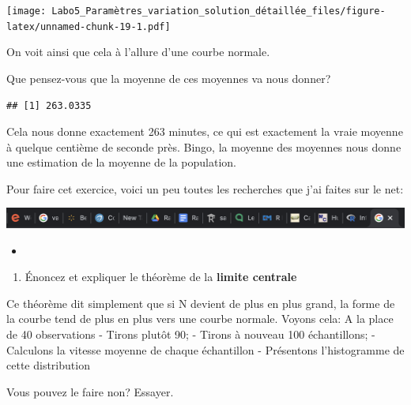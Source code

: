 \documentclass[
]{article}
\newenvironment{Shaded}{\begin{snugshade}}{\end{snugshade}}
\newcommand{\FunctionTok}[1]{\textcolor[rgb]{0.00,0.00,0.00}{#1}}
\newcommand{\NormalTok}[1]{#1}
\newcommand{\OtherTok}[1]{\textcolor[rgb]{0.56,0.35,0.01}{#1}}
\newcommand{\SpecialCharTok}[1]{\textcolor[rgb]{0.00,0.00,0.00}{#1}}
\providecommand{\tightlist}{%
  \setlength{\itemsep}{0pt}\setlength{\parskip}{0pt}}
\begin{document}
\texttt{[image: Labo5\_Paramètres\_variation\_solution\_détaillée\_files/figure-latex/unnamed-chunk-19-1.pdf]}

On voit ainsi que cela à l'allure d'une courbe normale.

Que pensez-vous que la moyenne de ces moyennes va nous donner?

\begin{Shaded}
\end{Shaded}

\begin{verbatim}
## [1] 263.0335
\end{verbatim}

Cela nous donne exactement 263 minutes, ce qui est exactement la vraie
moyenne à quelque centième de seconde près. Bingo, la moyenne des
moyennes nous donne une estimation de la moyenne de la population.

Pour faire cet exercice, voici un peu toutes les recherches que j'ai
faites sur le net:

\includegraphics{recherche_net.png}

\begin{itemize}
\tightlist
\item
\end{itemize}

\begin{enumerate}
\def\labelenumi{\arabic{enumi}.}
\setcounter{enumi}{5}
\tightlist
\item
  Énoncez et expliquer le théorème de la \textbf{limite centrale}
\end{enumerate}

Ce théorème dit simplement que si N devient de plus en plus grand, la
forme de la courbe tend de plus en plus vers une courbe normale. Voyons
cela: A la place de 40 observations - Tirons plutôt 90; - Tirons à
nouveau 100 échantillons; - Calculons la vitesse moyenne de chaque
échantillon - Présentons l'histogramme de cette distribution

Vous pouvez le faire non? Essayer.
\end{document}
